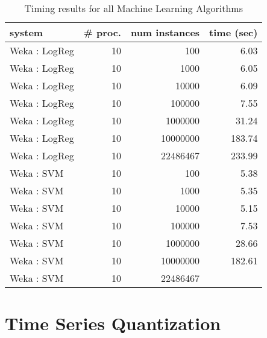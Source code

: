 \begin{table}
\begin{tabular}{|l|r|r|r|}
\hline
 system  &  \# proc.  &  num instances  &  time (sec)  \\
\hline
 Weka : LogReg    &           10  &            100  &        6.03  \\
 Weka : LogReg    &           10  &           1000  &        6.05  \\
 Weka : LogReg    &           10  &          10000  &        6.09  \\
 Weka : LogReg    &           10  &         100000  &        7.55  \\
 Weka : LogReg    &           10  &        1000000  &       31.24  \\
 Weka : LogReg    &           10  &       10000000  &      183.74  \\
 Weka : LogReg    &           10  &       22486467  &      233.99  \\
\hline
 Weka : SVM     &           10  &            100  &        5.38  \\
 Weka : SVM     &           10  &           1000  &        5.35  \\
 Weka : SVM     &           10  &          10000  &        5.15  \\
 Weka : SVM     &           10  &         100000  &        7.53  \\
 Weka : SVM     &           10  &        1000000  &       28.66  \\
 Weka : SVM     &           10  &       10000000  &      182.61  \\
 Weka : SVM     &           10  &       22486467  &      	  \\
\hline
\end{tabular}
\caption{Timing results for all Machine Learning Algorithms}
\label{table:machineLearningTiming2}
\end{table}



\section{Time Series Quantization}

